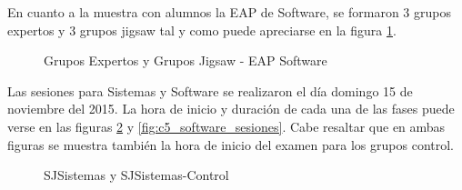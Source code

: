 En cuanto a la muestra con alumnos la EAP de Software, se formaron 3 grupos expertos y 3 grupos jigsaw tal y como puede apreciarse en la figura \ref{fig:c5_software_grupos}.

\begin{figure}[!h]
	\centering
	\caption{Grupos Expertos y Grupos Jigsaw - EAP Software}
	\label{fig:c5_software_grupos}
\end{figure}

Las sesiones para Sistemas y Software se realizaron el día domingo 15 de noviembre del 2015. La hora de inicio y duración de cada una de las fases puede verse en las figuras \ref{fig:c5_sistemas_sesiones} y \ref{fig:c5_software_sesiones}. Cabe resaltar que en ambas figuras se muestra también la hora de inicio del examen para los grupos control. 

\begin{figure}[!h]
	\centering
	\caption{SJSistemas y SJSistemas-Control}
	\label{fig:c5_sistemas_sesiones}
\end{figure}

